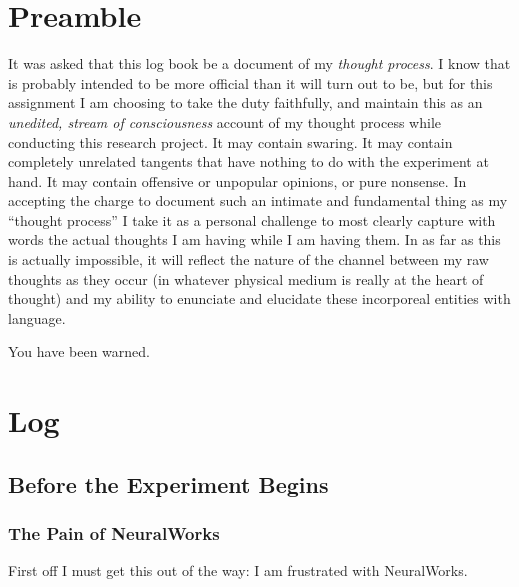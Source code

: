 \documentclass[12pt]{article}
\begin{document}
\maketitle

\section{Preamble}

It was asked that this log book be a document of my \emph{thought process}.  I know that is probably intended to be more official than it will turn out to be, but for this assignment I am choosing to take the duty faithfully, and maintain this as an \emph{unedited, stream of consciousness} account of my thought process while conducting this research project.  It may contain swaring.  It may contain completely unrelated tangents that have nothing to do with the experiment at hand.  It may contain offensive or unpopular opinions, or pure nonsense.  In accepting the charge to document such an intimate and fundamental thing as my ``thought process'' I take it as a personal challenge to most clearly capture with words the actual thoughts I am having while I am having them.  In as far as this is actually impossible, it will reflect the nature of the channel between my raw thoughts as they occur (in whatever physical medium is really at the heart of thought) and my ability to enunciate and elucidate these incorporeal entities with language.  

You have been warned.

\section{Log}

\subsection{Before the Experiment Begins}

\subsubsection{The Pain of NeuralWorks}

First off I must get this out of the way: I am frustrated with NeuralWorks.  
\end{document}
